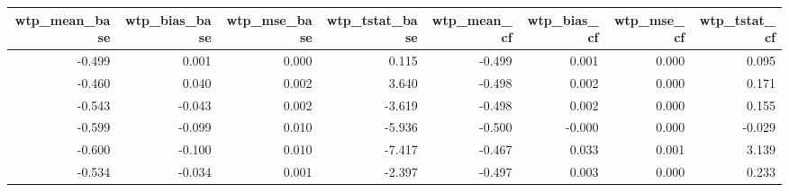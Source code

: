 \begin{tabular}{rrrrrrrr}
  \hline
wtp\_mean\_base & wtp\_bias\_base & wtp\_mse\_base & wtp\_tstat\_base & wtp\_mean\_cf & wtp\_bias\_cf & wtp\_mse\_cf & wtp\_tstat\_cf \\ 
  \hline
-0.499 & 0.001 & 0.000 & 0.115 & -0.499 & 0.001 & 0.000 & 0.095 \\ 
  -0.460 & 0.040 & 0.002 & 3.640 & -0.498 & 0.002 & 0.000 & 0.171 \\ 
  -0.543 & -0.043 & 0.002 & -3.619 & -0.498 & 0.002 & 0.000 & 0.155 \\ 
  -0.599 & -0.099 & 0.010 & -5.936 & -0.500 & -0.000 & 0.000 & -0.029 \\ 
  -0.600 & -0.100 & 0.010 & -7.417 & -0.467 & 0.033 & 0.001 & 3.139 \\ 
  -0.534 & -0.034 & 0.001 & -2.397 & -0.497 & 0.003 & 0.000 & 0.233 \\ 
   \hline
\end{tabular}
